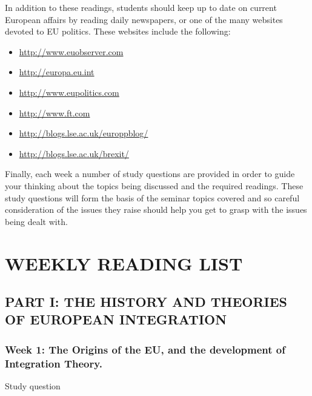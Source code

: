 In addition to these readings, students should keep up to date on current European affairs by reading daily newspapers, or one of the many websites devoted to EU politics. These websites include the following:

\begin{itemize}
	\item \url{http://www.euobserver.com}
	\item \url{http://europa.eu.int}
	\item \url{http://www.eupolitics.com}
	\item \url{http://www.ft.com}
	\item \url{http://blogs.lse.ac.uk/europpblog/}
	\item \url{http://blogs.lse.ac.uk/brexit/}
\end{itemize}

	Finally, each week a number of study questions are provided in order to guide your thinking about the topics being discussed and the required readings. These study questions will form the basis of the seminar topics covered and so careful consideration of the issues they raise should help you get to grasp with the issues being dealt with.

\section*{WEEKLY READING LIST}

\subsection*{PART I: THE HISTORY AND THEORIES OF EUROPEAN INTEGRATION}

\subsubsection*{Week 1: The Origins of the EU, and the development of Integration Theory.}

Study question

